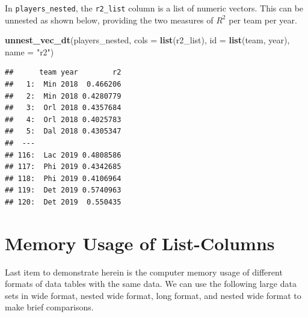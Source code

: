 \documentclass[doc,floatsintext]{apa6}
\newenvironment{Shaded}{\begin{snugshade}}{\end{snugshade}}
\newcommand{\DataTypeTok}[1]{\textcolor[rgb]{0.13,0.29,0.53}{#1}}
\newcommand{\KeywordTok}[1]{\textcolor[rgb]{0.13,0.29,0.53}{\textbf{#1}}}
\newcommand{\NormalTok}[1]{#1}
\newcommand{\StringTok}[1]{\textcolor[rgb]{0.31,0.60,0.02}{#1}}
\begin{document}
In \texttt{players\_nested}, the \texttt{r2\_list} column is a list of numeric vectors. This can be unnested as shown below, providing the two measures of \(R^2\) per team per year.

\begin{Shaded}
\begin{Highlighting}[]
\KeywordTok{unnest_vec_dt}\NormalTok{(players_nested, }
              \DataTypeTok{cols =} \KeywordTok{list}\NormalTok{(r2_list), }
              \DataTypeTok{id =} \KeywordTok{list}\NormalTok{(team, year), }
              \DataTypeTok{name =} \StringTok{"r2"}\NormalTok{)}
\end{Highlighting}
\end{Shaded}

\begin{verbatim}
##      team year        r2
##   1:  Min 2018  0.466206
##   2:  Min 2018 0.4280779
##   3:  Orl 2018 0.4357684
##   4:  Orl 2018 0.4025783
##   5:  Dal 2018 0.4305347
##  ---                    
## 116:  Lac 2019 0.4808586
## 117:  Phi 2019 0.4342685
## 118:  Phi 2019 0.4106964
## 119:  Det 2019 0.5740963
## 120:  Det 2019  0.550435
\end{verbatim}

\hypertarget{memory-usage-of-list-columns}{%
\section{Memory Usage of List-Columns}\label{memory-usage-of-list-columns}}

Last item to demonstrate herein is the computer memory usage of different formats of data tables with the same data. We can use the following large data sets in wide format, nested wide format, long format, and nested wide format to make brief comparisons.
\end{document}
